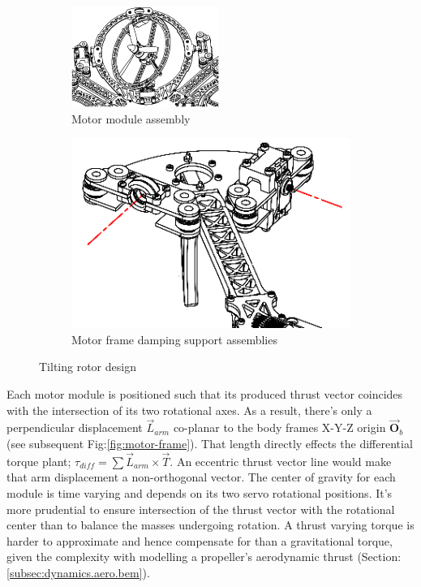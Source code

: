 \begin{figure}[hbtp]
\begin{subfigure}{.49\textwidth}
\centering
\includegraphics[width=\textwidth]{figs/motor-assembly}
\caption{Motor module assembly}
\label{fig:motor-assembly}
\end{subfigure}
\begin{subfigure}{.49\textwidth}
\centering
\includegraphics[width=\textwidth]{figs/motor-support}
\caption{Motor frame damping support assemblies}
\label{fig:motor_support}
\end{subfigure}
\caption{Tilting rotor design}
\end{figure}
Each motor module is positioned such that its produced thrust vector coincides with the intersection of its two rotational axes. As a result, there's only a perpendicular displacement $\vec{L}_{arm}$ co-planar to the body frames X-Y-Z origin $\vec{\mathbf{O}}_b$ (see subsequent Fig:\ref{fig:motor-frame}). That length directly effects the differential torque plant; $\tau_{diff}=\sum\vec{L}_{arm}\times\vec{T}$. An eccentric thrust vector line would make that arm displacement a non-orthogonal vector. The center of gravity for each module is time varying and depends on its two servo rotational positions. It's more prudential to ensure intersection of the thrust vector with the rotational center than to balance the masses undergoing rotation. A thrust varying torque is harder to approximate and hence compensate for than a gravitational torque, given the complexity with modelling a propeller's aerodynamic thrust (Section:\ref{subsec:dynamics.aero.bem}).
